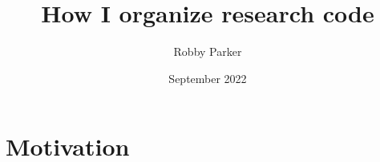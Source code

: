 \documentclass{article}
\title{How I organize research code}
\author{Robby Parker}
\date{September 2022}
\begin{document}
\maketitle

\section{Motivation}
\end{document}
